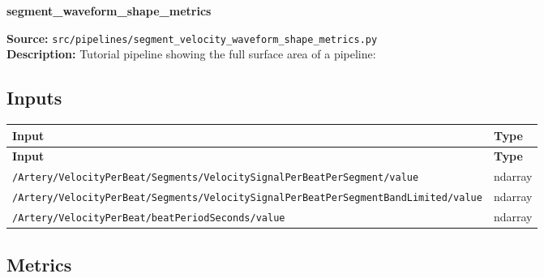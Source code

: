 \documentclass[11pt]{article}
\begin{document}
\begin{center}
\LARGE\textbf{segment\_waveform\_shape\_metrics}
\end{center}
\textbf{Source:} \texttt{src/\allowbreak{}pipelines/\allowbreak{}segment\_\allowbreak{}velocity\_\allowbreak{}waveform\_\allowbreak{}shape\_\allowbreak{}metrics.py}\\
\textbf{Description:} Tutorial pipeline showing the full surface area of a pipeline:

\subsection*{Inputs}
\begin{longtable}{|p{}|p{}|}
\hline
\textbf{Input} & \textbf{Type} \\ \hline
\endfirsthead
\hline
\textbf{Input} & \textbf{Type} \\ \hline
\endhead
{\scriptsize \texttt{/\allowbreak{}Artery/\allowbreak{}VelocityPerBeat/\allowbreak{}Segments/\allowbreak{}VelocitySignalPerBeatPerSegment/\allowbreak{}value}} & ndarray \\ \hline
{\scriptsize \texttt{/\allowbreak{}Artery/\allowbreak{}VelocityPerBeat/\allowbreak{}Segments/\allowbreak{}VelocitySignalPerBeatPerSegmentBandLimited/\allowbreak{}value}} & ndarray \\ \hline
{\scriptsize \texttt{/\allowbreak{}Artery/\allowbreak{}VelocityPerBeat/\allowbreak{}beatPeriodSeconds/\allowbreak{}value}} & ndarray \\ \hline
\end{longtable}

\subsection*{Metrics}
\end{document}
